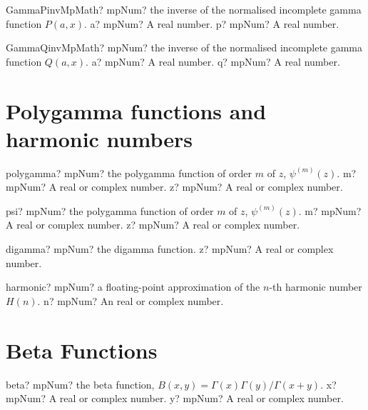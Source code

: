 \documentclass[12pt,a4paper,openany]{book}
\begin{document}
\begin{mpFunctionsExtract}
\mpFunctionTwoNotImplemented
{GammaPinvMpMath? mpNum? the inverse of the normalised incomplete gamma function $P(a,x)$.}
{a? mpNum? A real number.}
{p? mpNum? A real number.}
\end{mpFunctionsExtract}

\begin{mpFunctionsExtract}
\mpFunctionTwoNotImplemented
{GammaQinvMpMath? mpNum? the inverse of the normalised incomplete gamma function $Q(a,x)$.}
{a? mpNum? A real number.}
{q? mpNum? A real number.}
\end{mpFunctionsExtract}

\section{Polygamma functions and harmonic numbers}

\begin{mpFunctionsExtract}
\mpFunctionTwo
{polygamma? mpNum? the polygamma function of order $m$ of $z$, $\psi^{(m)}(z)$.}
{m? mpNum? A real or complex number.}
{z? mpNum? A real or complex number.}
\end{mpFunctionsExtract}

\begin{mpFunctionsExtract}
\mpFunctionTwo
{psi? mpNum? the polygamma function of order $m$ of $z$, $\psi^{(m)}(z)$.}
{m? mpNum? A real or complex number.}
{z? mpNum? A real or complex number.}
\end{mpFunctionsExtract}

\begin{mpFunctionsExtract}
\mpFunctionOne
{digamma? mpNum? the digamma function.}
{z? mpNum? A real or complex number.}
\end{mpFunctionsExtract}

\begin{mpFunctionsExtract}
\mpFunctionOne
{harmonic? mpNum? a floating-point approximation of the $n$-th harmonic number $H(n)$.}
{n? mpNum? An  real or complex number.}
\end{mpFunctionsExtract}

\section{Beta Functions}

\begin{mpFunctionsExtract}
\mpFunctionTwo
{beta? mpNum? the beta function, $B(x,y)=\Gamma(x) \Gamma(y)/\Gamma(x+y)$.}
{x? mpNum? A real or complex number.}
{y? mpNum? A real or complex number.}
\end{mpFunctionsExtract}
\end{document}
